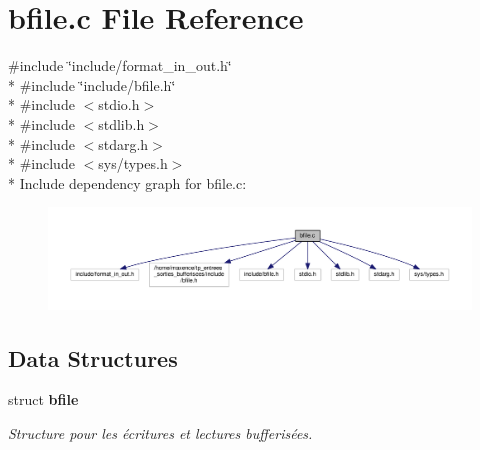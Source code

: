 \section{bfile.\+c File Reference}
\label{bfile_8c}
{\ttfamily \#include \char`\"{}include/format\+\_\+in\+\_\+out.\+h\char`\"{}}\\*
{\ttfamily \#include \char`\"{}include/bfile.\+h\char`\"{}}\\*
{\ttfamily \#include $<$stdio.\+h$>$}\\*
{\ttfamily \#include $<$stdlib.\+h$>$}\\*
{\ttfamily \#include $<$stdarg.\+h$>$}\\*
{\ttfamily \#include $<$sys/types.\+h$>$}\\*
Include dependency graph for bfile.\+c\+:
\nopagebreak
\begin{figure}[H]
\begin{center}
\leavevmode
\includegraphics[width=350pt]{bfile_8c__incl}
\end{center}
\end{figure}
\subsection*{Data Structures}
\begin{DoxyCompactItemize}
\item 
struct {\bf bfile}
\begin{DoxyCompactList}\small\item\em Structure pour les écritures et lectures bufferisées. \end{DoxyCompactList}\end{DoxyCompactItemize}
